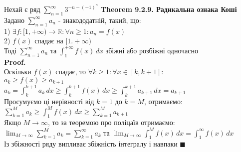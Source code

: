\documentclass[a4paper, 14pt]{extarticle}
\def\huge{\displaystyle}
\def\bigline{\vspace{5mm}\\}
\def\th#1{\textbf{Theorem {#1}}}
\def\proof{\textbf{Proof.}\\}
\def\bigline{\vspace{5mm}\\}
\def\qed{$\blacksquare$}
\begin{document}
Нехай є ряд $\huge \sum_{n=1}^\infty 3^{-n-(-1)^n}$
\th{9.2.9. Радикальна ознака Коші}\\
Задано $\huge \sum_{n=1}^{\infty} a_n$ - знакододатній, такий, що:\\
1) $\exists f: [1,+\infty) \to \mathbb{R}: \forall n \geq 1: a_n = f(x)$\\
2) $f(x)$ спадає на $[1.+\infty)$\\
Тоді $\huge \sum_{n = 1}^\infty a_n$ та $\huge \int_1^{+\infty} f(x)\,dx$ збіжні або розбіжні одночасно\\
\proof
Оскільки $f(x)$ спадає, то $\forall k \geq 1: \forall x \in [k, k+1]:$\\
$a_k \geq f(x) \geq a_{k+1}$\\
$\huge a_k = \int_k^{k+1} a_k \,dx \geq \int_k^{k+1} f(x)\,dx \geq \int_k^{k+1} a_{k+1}\,dx = a_{k+1}$\\
Просумуємо ці нерівності від $k = 1$ до $k = M$, отримаємо:\\
$\huge \sum_{k=1}^M a_k \geq \int_1^{M} f(x)\,dx \geq \sum_{k=1}^M a_{k+1}$\\
Якщо $M \to \infty$, то за теоремою про поліцаїв отримаємо:\\
$\huge \lim_{M \to \infty}  \sum_{k=1}^M a_{k} = \sum_{k=1}^{\infty} a_k$ та $\huge \lim_{M \to \infty} \int_1^M f(x)\,dx = \int_1^\infty f(x)\,dx$\\
Із збіжності ряду випливає збіжність інтегралу і навпаки \qed
\bigline
\end{document}
